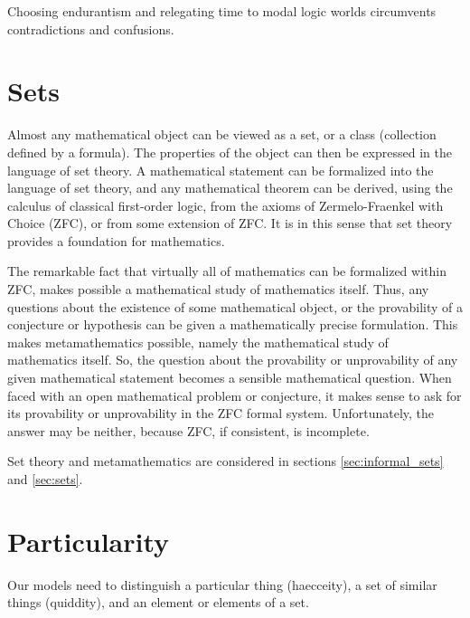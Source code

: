 
\pn Choosing endurantism and relegating time to modal logic worlds circumvents contradictions and confusions.

\section{Sets}\label{sec:metasets}

\pn Almost any mathematical object can be viewed as a set, or a class (collection defined by a formula). The properties of the object can then be expressed in the language of set theory. A mathematical statement can be formalized into the language of set theory, and any mathematical theorem can be derived, using the calculus of classical first-order logic, from the axioms of Zermelo-Fraenkel with Choice (ZFC), or from some extension of ZFC. It is in this sense that set theory provides a foundation for mathematics.\cite{set-theory}

\pn The remarkable fact that virtually all of mathematics can be formalized within ZFC, makes possible a mathematical study of mathematics itself. Thus, any questions about the existence of some mathematical object, or the provability of a conjecture or hypothesis can be given a mathematically precise formulation. This makes metamathematics possible, namely the mathematical study of mathematics itself. So, the question about the provability or unprovability of any given mathematical statement becomes a sensible mathematical question. When faced with an open mathematical problem or conjecture, it makes sense to ask for its provability or unprovability in the ZFC formal system. Unfortunately, the answer may be neither, because ZFC, if consistent, is incomplete.

\pn Set theory and metamathematics are considered in sections \ref{sec:informal_sets} and \ref{sec:sets}.

\section{Particularity}\label{sec:particularity}

\pn Our models need to distinguish a particular thing (haecceity), a set of similar things (quiddity), and an element or elements of a set.  


